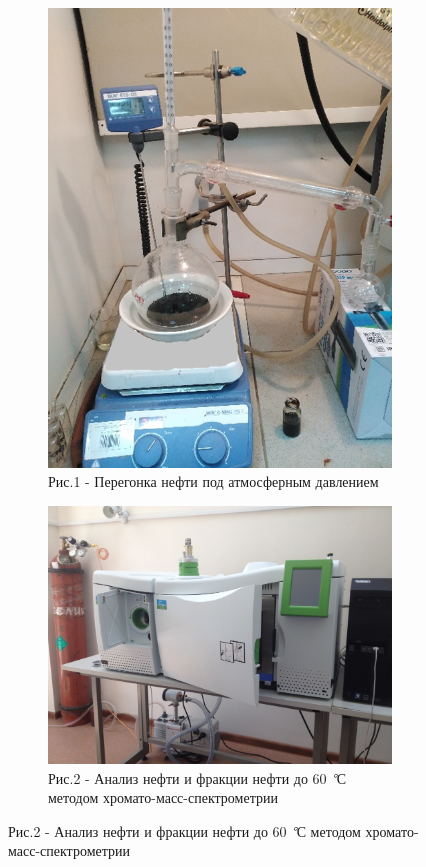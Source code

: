 \begin{figure}[H]
    \centering
    \begin{subfigure}[b]{0.33\textwidth}
        \centering
        \includegraphics[width=\textwidth]{assets/368}
        \caption*{Рис.1 - Перегонка нефти под атмосферным давлением}
    \end{subfigure}
    \begin{subfigure}[b]{0.58\textwidth}
        \centering
        \includegraphics[width=\textwidth]{assets/369}
        \caption*{Рис.2 - Анализ нефти и фракции нефти до 60 \emph{°}С методом хромато-масс-спектрометрии}
    \end{subfigure}
\end{figure}

